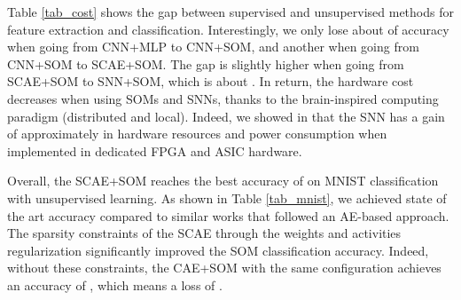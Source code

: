 \documentclass[runningheads]{llncs}
\begin{document}
Table \ref{tab_cost} shows the gap between supervised and unsupervised methods for feature extraction and classification. Interestingly, we only lose about  of accuracy when going from CNN+MLP to CNN+SOM, and another  when going from CNN+SOM to SCAE+SOM. The gap is slightly higher when going from SCAE+SOM to SNN+SOM, which is about . In return, the hardware cost decreases when using SOMs and SNNs, thanks to the brain-inspired computing paradigm (distributed and local).
Indeed, we showed in \cite{khacef2018mlp_vs_snn} that the SNN has a gain of approximately  in hardware resources and power consumption when implemented in dedicated FPGA and ASIC hardware.

\begin{table}[h]
\centering
\caption{MNIST unsupervised learning with AE-based feature extraction: state of the art reported from \cite{ji2018invariant_clustering}.}
\label{tab_mnist}
\begin{center}
\end{center}
\end{table}

Overall, the SCAE+SOM reaches the best accuracy of  on MNIST classification with unsupervised learning. As shown in Table \ref{tab_mnist}, we achieved state of the art accuracy compared to similar works that followed an AE-based approach.
The sparsity constraints of the SCAE through the weights and activities regularization significantly improved the SOM classification accuracy. Indeed, without these constraints, the CAE+SOM with the same configuration achieves an accuracy of , which means a loss of .
\end{document}

